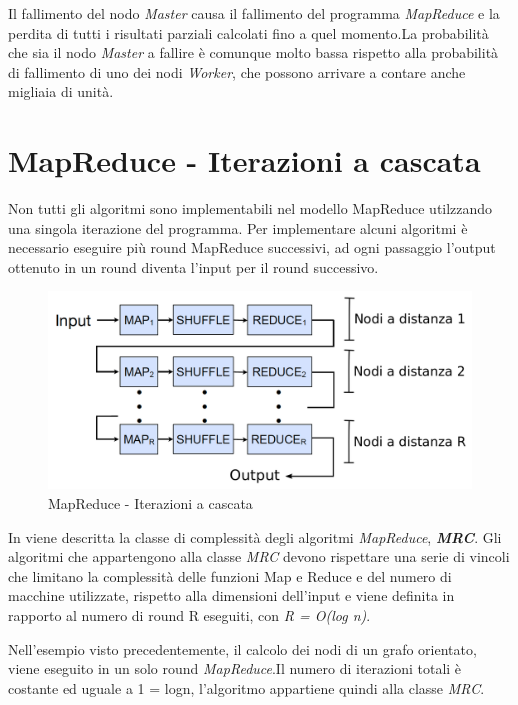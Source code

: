 \documentclass[LaM,binding=0.6cm]{sapthesis}
\begin{document}
Il fallimento del nodo \textit{Master} causa il fallimento del programma \textit{MapReduce} e la perdita di tutti i risultati parziali calcolati fino a quel momento.La probabilità che sia il nodo \textit{Master} a fallire è comunque molto bassa rispetto alla probabilità di fallimento di uno dei nodi \textit{Worker}, che possono arrivare a contare anche migliaia di unità.

\section{MapReduce - Iterazioni a cascata}

Non tutti gli algoritmi sono implementabili nel modello MapReduce \cite{Dean:2008:MSD:1327452.1327492} utilzzando una singola iterazione del programma. Per implementare alcuni algoritmi è necessario eseguire più round MapReduce successivi, ad ogni passaggio l'output ottenuto in un round diventa l'input per il round successivo.


\begin{figure}
\centering
\includegraphics[width=1\textwidth]{MR_cascata}
\caption{MapReduce - Iterazioni a cascata}
\label{fig:MR_cascata}
\end{figure}

In \cite{Karloff:2010:MCM:1873601.1873677} viene descritta la classe di complessità degli algoritmi \textit{MapReduce}, \textbf{\textit{MRC}}. 
Gli algoritmi che appartengono alla classe \textit{MRC} devono rispettare una serie di vincoli che limitano la complessità delle funzioni Map e Reduce e del numero di macchine utilizzate, rispetto alla dimensioni dell'input e viene definita in rapporto al numero di round R eseguiti, con \textit{R = O(log n)}.

Nell'esempio visto precedentemente, il calcolo dei nodi di un grafo orientato, viene eseguito in un solo round \textit{MapReduce}.Il numero di iterazioni totali è costante ed uguale a 1 = logn, l'algoritmo appartiene quindi alla classe \textit{MRC}.	
\end{document}
